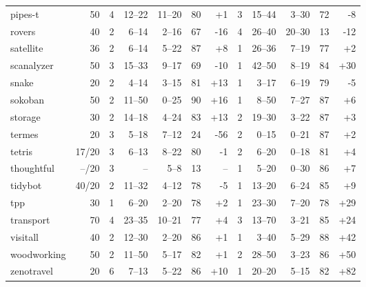 \documentclass{article}
\begin{document}
\begin{table}
\begin{tabular}{l@{}rr|rrrr|r|rrrr}
       pipes-t &     50 &   4 &   12--22 &  11--20 &  80 &   {\color{blue}+1} &   3 &    15--44 &   3--30 &  72 &    {\color{red}-8} \\
        rovers &     40 &   2 &    6--14 &   2--16 &  67 &   {\color{red}-16} &   4 &    26--40 &  20--30 &  13 &   {\color{red}-12} \\
     satellite &     36 &   2 &    6--14 &   5--22 &  87 &   {\color{blue}+8} &   1 &    26--36 &   7--19 &  77 &   {\color{blue}+2} \\
    scanalyzer &     50 &   3 &   15--33 &   9--17 &  69 &   {\color{red}-10} &   1 &    42--50 &   8--19 &  84 &  {\color{blue}+30} \\
         snake &     20 &   2 &    4--14 &   3--15 &  81 &  {\color{blue}+13} &   1 &     3--17 &   6--19 &  79 &    {\color{red}-5} \\
       sokoban &     50 &   2 &   11--50 &   0--25 &  90 &  {\color{blue}+16} &   1 &     8--50 &   7--27 &  87 &   {\color{blue}+6} \\
       storage &     30 &   2 &   14--18 &   4--24 &  83 &  {\color{blue}+13} &   2 &    19--30 &   3--22 &  87 &   {\color{blue}+3} \\
        termes &     20 &   3 &    5--18 &   7--12 &  24 &   {\color{red}-56} &   2 &     0--15 &   0--21 &  87 &   {\color{blue}+2} \\
        tetris &  17/20 &   3 &    6--13 &   8--22 &  80 &    {\color{red}-1} &   2 &     6--20 &   0--18 &  81 &   {\color{blue}+4} \\
    thoughtful &  --/20 &   3 &       -- &    5--8 &  13 &                 -- &   1 &     5--20 &   0--30 &  86 &   {\color{blue}+7} \\
       tidybot &  40/20 &   2 &   11--32 &   4--12 &  78 &    {\color{red}-5} &   1 &    13--20 &   6--24 &  85 &   {\color{blue}+9} \\
           tpp &     30 &   1 &    6--20 &   2--20 &  78 &   {\color{blue}+2} &   1 &    23--30 &   7--20 &  78 &  {\color{blue}+29} \\
     transport &     70 &   4 &   23--35 &  10--21 &  77 &   {\color{blue}+4} &   3 &    13--70 &   3--21 &  85 &  {\color{blue}+24} \\
      visitall &     40 &   2 &   12--30 &   2--20 &  86 &   {\color{blue}+1} &   1 &     3--40 &   5--29 &  88 &  {\color{blue}+42} \\
   woodworking &     50 &   2 &   11--50 &   5--17 &  82 &   {\color{blue}+1} &   2 &    28--50 &   3--23 &  86 &  {\color{blue}+50} \\
    zenotravel &     20 &   6 &    7--13 &   5--22 &  86 &  {\color{blue}+10} &   1 &    20--20 &   5--15 &  82 &  {\color{blue}+82} \\
\bottomrule
\end{tabular}

            \end{table}
            
\end{document}
